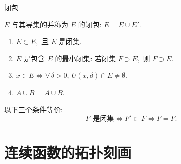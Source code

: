 
\begin{frame}{闭包}

\begin{Def}[闭包]
$E$ 与其导集的并称为 $E$ 的\alert{闭包}: $\overline{E} = E \cup E'.$
\end{Def}

\pause

\begin{prop}[闭包的性质]
\begin{enumerate}
\item $E \subset \overline{E},$ 且 $\overline{E}$ 是闭集.
\item $\overline{E}$ 是包含 $E$ 的最小闭集: 若闭集 $F \supset E,$ 则 $F \supset \overline{E}.$
\item $x \in \overline{E} \iff \forall\, \delta > 0,\ U(x, \delta) \cap E \neq \emptyset.$
\item $\overline{A \cup B} = \overline{A} \cup \overline{B}.$
\end{enumerate}
\end{prop}

\pause

\begin{thm}[闭集的充要条件]
以下三个条件等价:
\[
F \text{ 是闭集} \iff F' \subset F \iff F = \overline{F}.
\]
\end{thm}

\end{frame}


\section[拓扑刻画]{连续函数的拓扑刻画}


